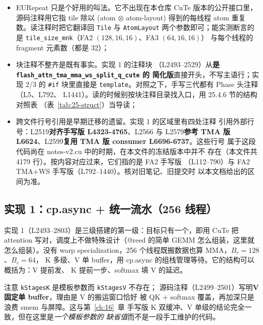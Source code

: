 \begin{itemize}[itemsep=2pt,topsep=2pt]
  \item EURepeat 只是个好用的叫法。它不出现在本仓库 CuTe 版本的公开接口里，
        源码注释用它指 tile 除以 (atom $\otimes$ atom-layout) 得到的每线程
        atom 重复数。读注释时把它翻译回 \texttt{Tile} 与
        \texttt{AtomLayout} 两个参数即可；能实测断言的是
        \texttt{tile\_\allowbreak{}size\_\allowbreak{}mnk}（FA2 $(128,16,16)$、FA3 $(64,16,16)$）
        与每个线程的 fragment 元素数（都是 32）；
  \item 块注释不整齐是既有事实。实现 1 的注释块
        （L2493--2529）从\textbf{是 \texttt{flash\_\allowbreak{}attn\_\allowbreak{}tma\_\allowbreak{}mma\_\allowbreak{}ws\_\allowbreak{}split\_\allowbreak{}q\_\allowbreak{}cute} 的
        简化版}直接开头，不写主语行；实现 2/3 的 \texttt{\#if} 块里直接是
        \texttt{template}。对照之下，手写三代都有 Phase 头注释（L5、L792、
        L1441）。读的时候别按块注释目录找入口，用 25.4.6 节的结构对照表
        （表~\ref{tab:25-struct}）当导读；
  \item 跨文件行号引用是早期迁移的遗留。实现 1 的区域里有四处注释
        引用外部行号：L2519\textbf{对齐手写版 L4323-4765}、L2566 与 L2579\textbf{参考
        TMA 版 L6624}、L2599\textbf{复用 TMA 版 consumer L6696-6737}。这些行号
        属于这段代码尚在 notes-v2.cu 中的时期，在本文件的冻结版本中并不
        存在（本文件共 4179 行）。按内容对应过来，它们指的是 FA2 手写版
        （L112--790）与 FA2 TMA+WS 手写版（L792--1440）。核对旧笔记、旧提交时
        以本文档给出的区间为准。
\end{itemize}

\subsection{实现 1：cp.async + 统一流水（256 线程）}

实现 1（L2493--2803）是三级搭建的第一级：目标只有一个，即用 CuTe 把 attention
写对，调度上不做特殊设计（@reed 的简单 GEMM 怎么组装，这里就怎么组装）。没有
warp specialization，256 个线程既搬数据也算 MMA，$B_r{=}128$、$B_c{=}64$，
K 多级、V 单 buffer，用 cp.async 的组栈管理等待。它的结构可以概括为：V 提前发、
K 提前一步、softmax 填 V 的延迟。



注意 \texttt{kStagesK} 是模板参数而 \texttt{kStagesV} 不存在；
源码注释（L2499--2501）写明\textbf{V 固定单 buffer}，理由是 V 的搬运窗口恰好
被 QK + softmax 覆盖，再加深只是浪费 smem 与屏障。这与第~\ref{ch:16}~章
手写版 K 双缓冲、V 单级的结论完全一致，但在这里是\emph{一个模板参数的
缺省值}而不是一段手工维护的代码。

